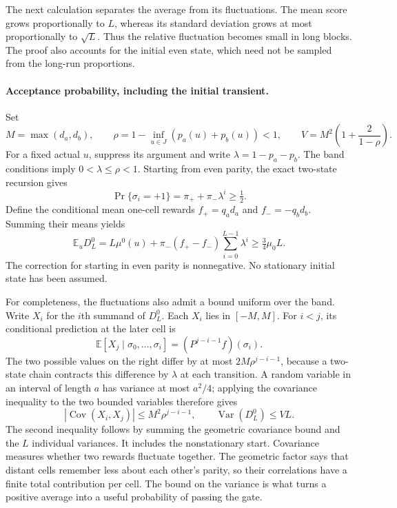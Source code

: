 \documentclass[11pt,a4paper]{article}
\numberwithin{equation}{section}
\theoremstyle{remark}
\begin{document}
The next calculation separates the average from its fluctuations.  The mean
score grows proportionally to $L$, whereas its standard deviation grows at
most proportionally to $\sqrt L$.  Thus the relative fluctuation becomes
small in long blocks.  The proof also accounts for the initial even state,
which need not be sampled from the long-run proportions.

\paragraph{Acceptance probability, including the initial transient.}
Set
\begin{equation}
 M=\max(d_a,d_b),\qquad
 \rho=1-\inf_{u\in J}(p_a(u)+p_b(u))<1,
 \qquad
 V=M^2\left(1+\frac{2}{1-\rho}\right).
 \label{phase:varianceconstant}
\end{equation}
For a fixed actual $u$, suppress its argument and write
$\lambda=1-p_a-p_b$.  The band conditions imply $0<\lambda\le\rho<1$.
Starting from even parity, the exact two-state recursion gives
\begin{equation}
 \Pr\{\sigma_i=+1\}=\pi_++\pi_-\lambda^i\ge\tfrac12.
 \label{phase:evenprob}
\end{equation}
Define the conditional mean one-cell rewards
$f_+=q_ad_a$ and $f_-=-q_bd_b$.  Summing their means yields
\begin{equation}
 \mathbb E_u D_L^0
 =L\mu^0(u)+\pi_-(f_+-f_-)
   \sum_{i=0}^{L-1}\lambda^i
 \ge\tfrac34\mu_0 L.
 \label{phase:mean}
\end{equation}
The correction for starting in even parity is nonnegative.  No stationary
initial state has been assumed.

For completeness, the fluctuations also admit a bound uniform over the band.
Write $X_i$ for the $i$th summand of $D_L^0$.  Each $X_i$ lies in $[-M,M]$.
For $i<j$, its conditional prediction at the later cell is
\begin{equation}
 \mathbb E[X_j\mid\sigma_0,\ldots,\sigma_i]
 =(P^{j-i-1}f)(\sigma_i).
 \label{phase:conditionalreward}
\end{equation}
The two possible values on the right differ by at most
$2M\rho^{j-i-1}$, because a two-state chain contracts this difference by
$\lambda$ at each transition.  A random variable in an interval of length
$a$ has variance at most $a^2/4$; applying the covariance inequality to the
two bounded variables therefore gives
\begin{equation}
 |\operatorname{Cov}(X_i,X_j)|\le M^2\rho^{j-i-1},
 \qquad
 \operatorname{Var}(D_L^0)\le VL.
 \label{phase:variance}
\end{equation}
The second inequality follows by summing the geometric covariance bound and
the $L$ individual variances.  It includes the nonstationary start.
Covariance measures whether two rewards fluctuate together.  The geometric
factor says that distant cells remember less about each other's parity, so
their correlations have a finite total contribution per cell.  The bound
on the variance is what turns a positive average into a useful probability
of passing the gate.
\end{document}

